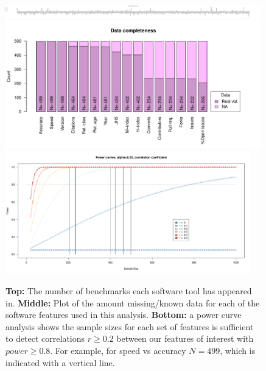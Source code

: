 \documentclass[fleqn,10pt]{SelfArx} %
\def\numTools{499}
\begin{document}

\clearpage
\newpage

\begin{figure}[H]
\centering
\includegraphics[width=0.99\textwidth]{numberBenchmarksPerToolBarplot.pdf}\\
\includegraphics[width=0.99\textwidth]{numberRealValueFeaturesBarplot.pdf}\\
\includegraphics[width=0.95\textwidth]{powerCurves.pdf}

\caption{ {\bf Top:} The number of benchmarks each software tool has appeared in. {\bf Middle:}
  Plot of the amount missing/known data for each of the software features used in this analysis. 
{\bf Bottom:} a power curve analysis shows the sample sizes for each set of features is sufficient to detect correlations $r\ge0.2$ between our features of interest with $power \ge 0.8$. For example, for speed vs accuracy $N=\numTools$, which is indicated with a vertical line.    
}
\label{fig:numBenchmarks}
\end{figure}
\end{document}

